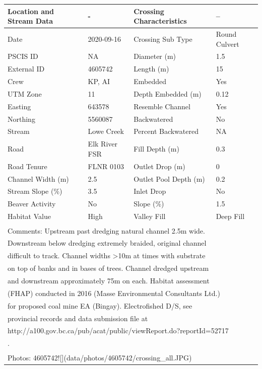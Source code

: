 \documentclass[
]{book}
\begin{document}
\begin{tabular}{llll}
\toprule
Location and Stream Data & - & Crossing Characteristics & --\\
\midrule
Date & 2020-09-16 & Crossing Sub Type & Round Culvert\\
PSCIS ID & NA & Diameter (m) & 1.5\\
External ID & 4605742 & Length (m) & 15\\
Crew & KP, AI & Embedded & Yes\\
UTM Zone & 11 & Depth Embedded (m) & 0.12\\
\addlinespace
Easting & 643578 & Resemble Channel & Yes\\
Northing & 5560087 & Backwatered & No\\
Stream & Lowe Creek & Percent Backwatered & NA\\
Road & Elk River FSR & Fill Depth (m) & 0.3\\
Road Tenure & FLNR 0103 & Outlet Drop (m) & 0\\
\addlinespace
Channel Width (m) & 2.5 & Outlet Pool Depth (m) & 0.2\\
Stream Slope (\%) & 3.5 & Inlet Drop & No\\
Beaver Activity & No & Slope (\%) & 1.5\\
Habitat Value & High & Valley Fill & Deep Fill\\
\bottomrule
\multicolumn{4}{l}{\textsuperscript{} Comments: Upstream past dredging natural channel 2.5m wide.}\\
\multicolumn{4}{l}{Downstream below dredging extremely braided, original channel}\\
\multicolumn{4}{l}{difficult to track. Channel widths >10m at times with substrate}\\
\multicolumn{4}{l}{on top of banks and in bases of trees. Channel dredged upstream}\\
\multicolumn{4}{l}{and downstream approximately 75m on each. Habitat assessment}\\
\multicolumn{4}{l}{(FHAP) conducted in 2016 (Masse Environmental Consultants Ltd.)}\\
\multicolumn{4}{l}{for proposed coal mine EA (Bingay). Electrofished D/S, see}\\
\multicolumn{4}{l}{provincial records and data submission file at}\\
\multicolumn{4}{l}{http://a100.gov.bc.ca/pub/acat/public/viewReport.do?reportId=52717}\\
\multicolumn{4}{l}{.}\\
\multicolumn{4}{l}{\textsuperscript{} Photos: 4605742![](data/photos/4605742/crossing\_all.JPG)}\\
\end{tabular}
\end{document}
